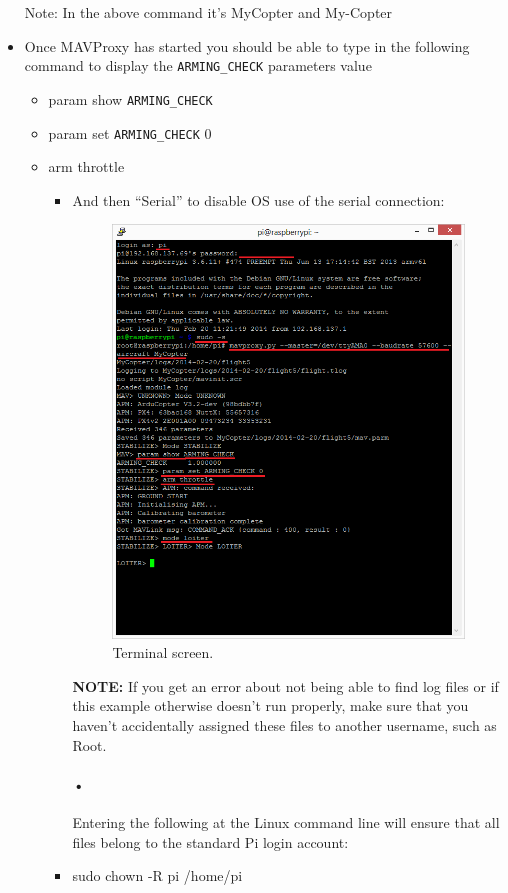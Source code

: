 \documentclass[11pt,a4paper]{article}
\begin{document}
\begin{itemize}
				 
				Note: In the above command it's MyCopter and My-Copter
				\item Once MAVProxy has started you should be able to type in the following command to display the \texttt{ARMING\_CHECK} parameters value
				\begin{itemize}
					\item param show \texttt{ARMING\_CHECK}
					\item param set \texttt{ARMING\_CHECK} 0
					\item arm throttle
					\begin{itemize}
			\item And then “Serial” to disable OS use of the serial connection:
			\begin{figure}[H]
	 	\centering
		\includegraphics[scale=0.6]{connect}
		\caption{Terminal screen.}
\end{figure}
	\textbf{NOTE:} If you get an error about not being able to find log files or if this example otherwise doesn’t run properly, make sure that you haven’t accidentally assigned these files to another username, such as Root.
	\paragraph{•}Entering the following at the Linux command line will ensure that all files belong to the standard Pi login account:
	\item sudo chown -R pi /home/pi
		\end{itemize}
				\end{itemize}
				
			\end{itemize}
\end{document}
